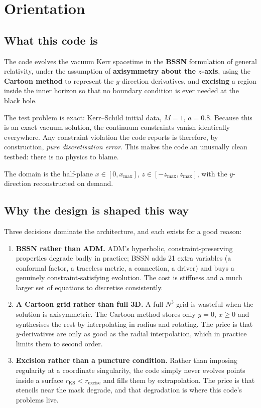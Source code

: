 \section{Orientation}
\label{ch:orientation}

\subsection{What this code is}

The code evolves the vacuum Kerr spacetime in the \textbf{BSSN} formulation of
general relativity, under the assumption of \textbf{axisymmetry about the
$z$-axis}, using the \textbf{Cartoon method} to represent the $y$-direction
derivatives, and \textbf{excising} a region inside the inner horizon so that no
boundary condition is ever needed at the black hole.

The test problem is exact: Kerr--Schild initial data, $M=1$, $a=0.8$. Because
this is an exact vacuum solution, the continuum constraints vanish identically
everywhere. Any constraint violation the code reports is therefore, by
construction, \emph{pure discretisation error}. This makes the code an
unusually clean testbed: there is no physics to blame.

The domain is the half-plane $x \in [0, x_{\max}]$, $z \in [-z_{\max},
z_{\max}]$, with the $y$-direction reconstructed on demand.

\subsection{Why the design is shaped this way}

Three decisions dominate the architecture, and each exists for a good reason:

\begin{enumerate}
\item \textbf{BSSN rather than ADM.} ADM's hyperbolic, constraint-preserving
      properties degrade badly in practice; BSSN adds 21 extra variables (a
      conformal factor, a traceless metric, a connection, a driver) and buys a
      genuinely constraint-satisfying evolution. The cost is stiffness and a
      much larger set of equations to discretise consistently.
\item \textbf{A Cartoon grid rather than full 3D.} A full
      $N^3$ grid is wasteful when the solution is axisymmetric. The Cartoon
      method stores only $y=0$, $x \geq 0$ and synthesises the rest by
      interpolating in radius and rotating. The price is that $y$-derivatives
      are only as good as the radial interpolation, which in practice limits
      them to second order.
\item \textbf{Excision rather than a puncture condition.} Rather than imposing
      regularity at a coordinate singularity, the code simply never evolves
      points inside a surface $r_{\mathrm{KS}} < r_{\mathrm{excise}}$ and
      fills them by extrapolation. The price is that stencils near the mask
      degrade, and that degradation is where this code's problems live.
\end{enumerate}

